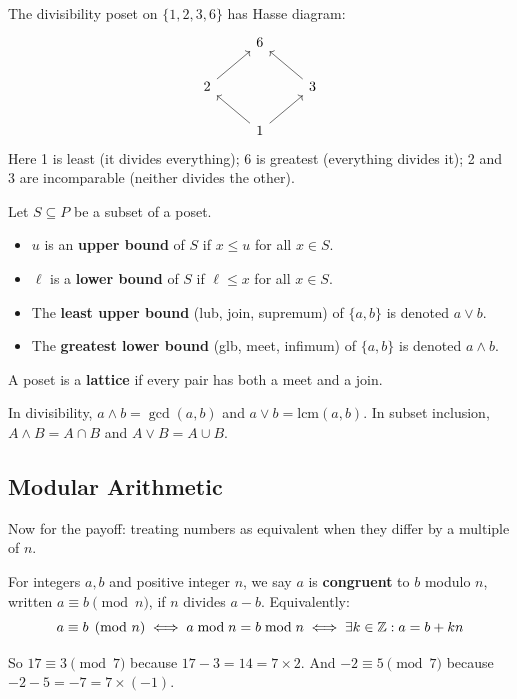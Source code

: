 \begin{example}
The divisibility poset on $\{1, 2, 3, 6\}$ has Hasse diagram:
\[
\begin{tikzcd}
 & 6 & \\
2 \arrow[ur] & & 3 \arrow[ul] \\
 & 1 \arrow[ul] \arrow[ur] &
\end{tikzcd}
\]
Here 1 is least (it divides everything); 6 is greatest (everything divides it); 2 and 3 are incomparable (neither divides the other).
\end{example}

\begin{definition}
Let $S \subseteq P$ be a subset of a poset.
\begin{itemize}
  \item $u$ is an \textbf{upper bound} of $S$ if $x \leq u$ for all $x \in S$.
  \item $\ell$ is a \textbf{lower bound} of $S$ if $\ell \leq x$ for all $x \in S$.
  \item The \textbf{least upper bound} (lub, join, supremum) of $\{a,b\}$ is denoted $a \vee b$.
  \item The \textbf{greatest lower bound} (glb, meet, infimum) of $\{a,b\}$ is denoted $a \wedge b$.
\end{itemize}
A poset is a \textbf{lattice} if every pair has both a meet and a join.
\end{definition}

In divisibility, $a \wedge b = \gcd(a,b)$ and $a \vee b = \text{lcm}(a,b)$. In subset inclusion, $A \wedge B = A \cap B$ and $A \vee B = A \cup B$.

\subsection*{Modular Arithmetic}

Now for the payoff: treating numbers as equivalent when they differ by a multiple of $n$.

\begin{definition}
For integers $a, b$ and positive integer $n$, we say $a$ is \textbf{congruent} to $b$ modulo $n$, written $a \equiv b \pmod{n}$, if $n$ divides $a - b$. Equivalently:
\[
a \equiv b \pmod{n} \iff a \bmod n = b \bmod n \iff \exists k \in \mathbb{Z}: a = b + kn
\]
\end{definition}

So $17 \equiv 3 \pmod{7}$ because $17 - 3 = 14 = 7 \times 2$. And $-2 \equiv 5 \pmod{7}$ because $-2 - 5 = -7 = 7 \times (-1)$.

